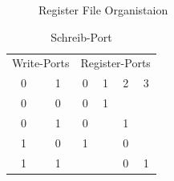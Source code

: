 \begin{figure}[htbp] 
	\centering
	
	\caption{Register File Organistaion}
	\label{fig:reg_orga}
\end{figure}

\begin{table}[htbp]
	
	\begin{minipage}{.5\textwidth}
		\flushleft
		\begin{tabular}{cccccc}
			\multicolumn{2}{l}{Write-Ports}                 & \multicolumn{4}{|l}{Register-Ports}                                                               \\ 
			\multicolumn{1}{c}{0} & \multicolumn{1}{c}{1} & \multicolumn{1}{|c}{0} & \multicolumn{1}{c}{1} & \multicolumn{1}{c}{2} & \multicolumn{1}{c}{3} \\ 
			\hline
			\multicolumn{1}{c}{0} & \multicolumn{1}{c}{0} & \multicolumn{1}{|c}{0} & \multicolumn{1}{c}{1} & \multicolumn{1}{c}{} & \multicolumn{1}{c}{} \\ 
			\multicolumn{1}{c}{0} & \multicolumn{1}{c}{1} & \multicolumn{1}{|c}{0} & \multicolumn{1}{c}{} & \multicolumn{1}{c}{1} & \multicolumn{1}{c}{} \\ 
			\multicolumn{1}{c}{1} & \multicolumn{1}{c}{0} & \multicolumn{1}{|c}{1} & \multicolumn{1}{c}{} & \multicolumn{1}{c}{0} & \multicolumn{1}{c}{} \\ 
			\multicolumn{1}{c}{1} & \multicolumn{1}{c}{1} & \multicolumn{1}{|c}{} & \multicolumn{1}{c}{} & \multicolumn{1}{c}{0} &  \multicolumn{1}{c}{1}                   
		\end{tabular}
		\caption{\label{fig::schreib-port}Schreib-Port}
	\end{minipage}
	\hfill
	\begin{minipage}{.5\textwidth}
		\flushleft
		

\end{minipage}
\end{table}
